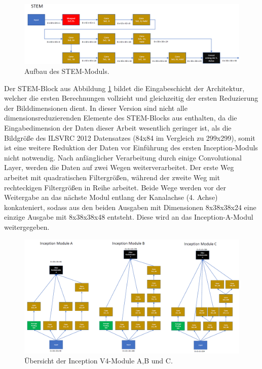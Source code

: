 \newpage
\begin{figure}[H]
\centering
\thispagestyle{empty}
\includegraphics[angle=90, scale=0.65]{pictures/Inception/STEM}
\caption[Caption for LOF]{Aufbau des STEM-Moduls.}
\label{fig:stem}
\end{figure}

Der STEM-Block aus Abbildung \ref{fig:stem} bildet die Eingabeschicht der Architektur, welcher die ersten Berechnungen vollzieht und gleichzeitig der ersten Reduzierung der Bilddimensionen dient. In dieser Version sind nicht alle dimensionsreduzierenden Elemente des STEM-Blocks aus \textcite{DBLP:journals/corr/SzegedyIV16} enthalten, da die Eingabedimension der Daten dieser Arbeit wesentlich geringer ist, als die Bildgröße des ILSVRC 2012 Datensatzes (84x84 im Vergleich zu 299x299), somit ist eine weitere Reduktion der Daten vor Einführung des ersten Inception-Moduls nicht notwendig. Nach anfänglicher Verarbeitung durch einige Convolutional Layer, werden die Daten auf zwei Wegen weiterverarbeitet. Der erste Weg arbeitet mit quadratischen Filtergrößen, während der zweite Weg mit rechteckigen Filtergrößen in Reihe arbeitet. Beide Wege werden vor der Weitergabe an das nächste Modul entlang der Kanalachse (4. Achse) konkateniert, sodass aus den beiden Ausgaben mit Dimensionen 8x38x38x24 eine einzige Ausgabe mit 8x38x38x48 entsteht. Diese wird an das Inception-A-Modul weitergegeben. 

\begin{figure}[H]
\centering
\includegraphics[scale=0.4]{pictures/Inception/InceptionABC}
\caption[Caption for LOF]{Übersicht der Inception V4-Module A,B und C.}
\label{fig:incmod}
\end{figure}

